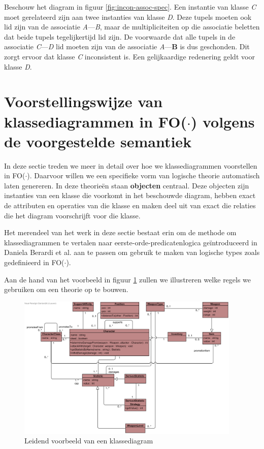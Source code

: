Beschouw het diagram in figuur \ref{fig:incon-assoc-spec}. Een instantie van klasse \textit{C} moet gerelateerd zijn aan twee instanties van klasse \textit{D}. Deze tupels moeten ook lid zijn van de associatie \textit{A}---\textit{B}, maar de multipliciteiten op die associatie beletten dat beide tupels tegelijkertijd lid zijn. De voorwaarde dat alle tupels in de associatie \textit{C}---\textit{D} lid moeten zijn van de associatie \textit{A}---\textbf{B} is dus geschonden. Dit zorgt ervoor dat klasse \textit{C} inconsistent is. Een gelijkaardige redenering geldt voor klasse \textit{D}.

\section{Voorstellingswijze van klassediagrammen in FO($\cdot$) volgens de voorgestelde semantiek}\label{sec:cd-rep-cons}

In deze sectie treden we meer in detail over hoe we klassediagrammen voorstellen in FO($\cdot$). Daarvoor willen we een specifieke vorm van logische theorie automatisch laten genereren. In deze theorie\"en staan \textbf{objecten} centraal. Deze objecten zijn instanties van een klasse die voorkomt in het beschouwde diagram, hebben exact de attributen en operaties van die klasse en maken deel uit van exact die relaties die het diagram voorschrijft voor die klasse.

Het merendeel van het werk in deze sectie bestaat erin om de methode om klassediagrammen te vertalen naar eerste-orde-predicatenlogica ge\"introduceerd in Daniela Berardi et al.\cite{BerardiDaniela2005RoUc} aan te passen om gebruik te maken van logische types zoals gedefinieerd in FO($\cdot$).

Aan de hand van het voorbeeld in figuur \ref{fig:diagram-voorbeeld} zullen we illustreren welke regels we gebruiken om een theorie op te bouwen.

\begin{figure}[h]
	\includegraphics[width=0.95\textwidth]{chap-consistentie/diagram-voorbeeld.png}
	\caption{Leidend voorbeeld van een klassediagram}
	\label{fig:diagram-voorbeeld}
\end{figure}

